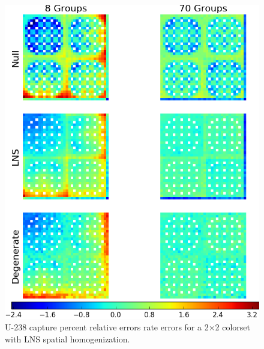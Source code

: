 \begin{figure}[h!]
\centering
\includegraphics[width=\linewidth]{figures/patterns/lns/reflector/capt-err}
\vspace{2mm}
\caption[U-238 capture rate errors for a 2$\times$2 colorset with a reflector]{U-238 capture percent relative errors rate errors for a 2$\times$2 colorset with \ac{LNS} spatial homogenization.}
\label{fig:chap9-reflector-lns-capt-err}
\end{figure}

\clearpage

